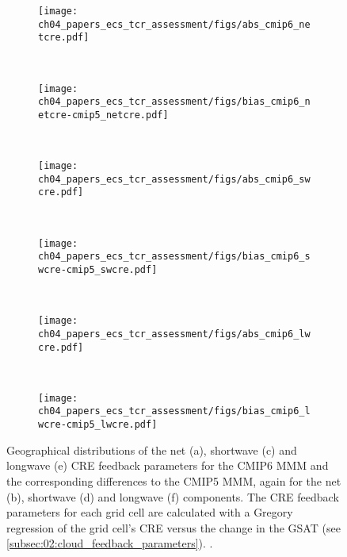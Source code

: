 \begin{figure}[p]
  \centering
  \begin{subfigure}[b]{\SubfigureWidth{}}
    \texttt{[image: 
      ch04\_papers\_ecs\_tcr\_assessment/figs/abs\_cmip6\_netcre.pdf]}
    \caption{}
    \label{fig:04:cloud_feedback_parameters:a}
  \end{subfigure}
  ~
  \begin{subfigure}[b]{\SubfigureWidth{}}
    \texttt{[image: 
      ch04\_papers\_ecs\_tcr\_assessment/figs/bias\_cmip6\_netcre-cmip5\_netcre.pdf]}
    \caption{}
    \label{fig:04:cloud_feedback_parameters:b}
  \end{subfigure}
  \\
  \begin{subfigure}[b]{\SubfigureWidth{}}
    \texttt{[image: 
      ch04\_papers\_ecs\_tcr\_assessment/figs/abs\_cmip6\_swcre.pdf]}
    \caption{}
    \label{fig:04:cloud_feedback_parameters:c}
  \end{subfigure}
  ~
  \begin{subfigure}[b]{\SubfigureWidth{}}
    \texttt{[image: 
      ch04\_papers\_ecs\_tcr\_assessment/figs/bias\_cmip6\_swcre-cmip5\_swcre.pdf]}
    \caption{}
    \label{fig:04:cloud_feedback_parameters:d}
  \end{subfigure}
  \\
  \begin{subfigure}[b]{\SubfigureWidth{}}
    \texttt{[image: 
      ch04\_papers\_ecs\_tcr\_assessment/figs/abs\_cmip6\_lwcre.pdf]}
    \caption{}
    \label{fig:04:cloud_feedback_parameters:e}
  \end{subfigure}
  ~
  \begin{subfigure}[b]{\SubfigureWidth{}}
    \texttt{[image: 
      ch04\_papers\_ecs\_tcr\_assessment/figs/bias\_cmip6\_lwcre-cmip5\_lwcre.pdf]}
    \caption{}
    \label{fig:04:cloud_feedback_parameters:f}
  \end{subfigure}
  \caption[
    Geographical distributions of the \acl{CRE} feedback parameters for the
    \acs{CMIP}5 and \acs{CMIP}6 \aclp{MMM}.
  ]{
    Geographical distributions of the net (a), shortwave (c) and longwave (e)
    \acf{CRE} feedback parameters for the \acs{CMIP}6 \acf{MMM} and the
    corresponding differences to the \acs{CMIP}5 \acs{MMM}, again for the net
    (b), shortwave (d) and longwave (f) components. The \acs{CRE} feedback
    parameters for each grid cell are calculated with a Gregory regression of
    the grid cell's \acs{CRE} versus the change in the \acl{GSAT} (see
    \cref{subsec:02:cloud_feedback_parameters}). .
  }
  \label{fig:04:cloud_feedback_parameters}
\end{figure}

